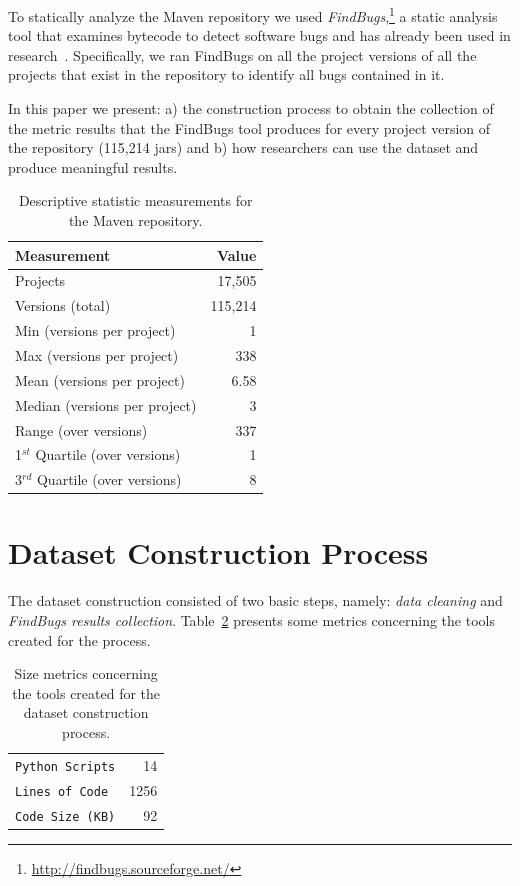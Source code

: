 \documentclass{sig-alternate}
\begin{document}
To statically analyze the Maven repository
we used {\it FindBugs},\footnote{\url{http://findbugs.sourceforge.net/}}
a static analysis tool that examines bytecode to detect software bugs
and has already been used in research~\cite{AP10,SHP06}.
Specifically, we ran FindBugs on all the project versions of all
the projects that exist in the repository
to identify all bugs contained in it.

In this paper we present: a) the construction process to obtain the
collection of the metric results that the FindBugs tool produces 
for every project version of the repository (115,214 {\sc jar}s)
and b) how researchers can use the dataset and produce
meaningful results.

\begin{table}
\centering
\begin{tabular}{l r}
\hline
Measurement & Value\\
 \hline
Projects & 17,505\\
Versions (total) & 115,214\\
Min (versions per project) & 1\\
Max (versions per project) & 338\\
Mean (versions per project) & 6.58\\
Median (versions per project) & 3\\
Range (over versions) & 337\\
1$^{st}$ Quartile (over versions) & 1\\
3$^{rd}$ Quartile (over versions) & 8\\
\hline
\end{tabular}
\caption{Descriptive statistic measurements for the Maven repository.}
\label{tbl:repository}
\end{table}

\section{Dataset Construction Process}
\label{sec:exp}

The dataset construction consisted of two basic steps,
namely: {\it data cleaning} and {\it FindBugs results
collection}. Table~\ref{tbl:tools-size} presents some
metrics concerning the tools created for
the process.

\begin{table}
\centering
\begin{tabular}{l r}
 \hline
\verb|Python Scripts| & 14\\
\verb|Lines of Code| & 1256\\
\verb|Code Size (KB)| & 92\\
\hline
\end{tabular}
\caption{Size metrics concerning
the tools created for
the dataset construction process.}
\label{tbl:tools-size}
\end{table}
\end{document}
